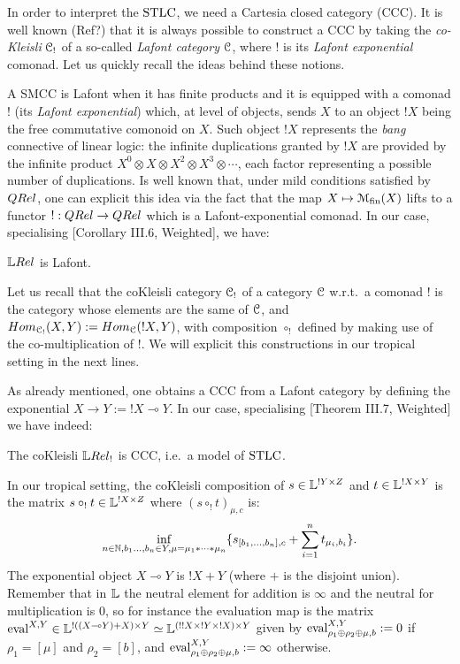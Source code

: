 
In order to interpret the $\mathrm{STLC}$, we need a Cartesia closed category (CCC).
It is well known ({\color{red}Ref?}) that it is always possible to construct a CCC by taking the \emph{co-Kleisli} $\mathcal{C}_!$ of a so-called \emph{Lafont category} $\mathcal{C}$, where $!$ is its \emph{Lafont exponential} comonad.
Let us quickly recall the ideas behind these notions.

A SMCC is Lafont when it has finite products and it is equipped with a comonad $!$ (its \emph{Lafont exponential}) which, at level of objects, sends $X$ to an object $!X$ being the free commutative comonoid on $X$.
Such object $!X$ represents the \emph{bang} connective of linear logic:
the infinite duplications granted by $!X$ are provided by the infinite product $X^0\otimes X\otimes X^2\otimes X^3\otimes\cdots$, each factor representing a possible number of duplications.
Is well known that, under mild conditions satisfied by $\QREL$, one can explicit this idea via the fact that the map $X\mapsto \mathcal{M}_{\mathrm{fin}}(X)$ lifts to a functor $!:\QREL\to\QREL$ which is a Lafont-exponential comonad.
In our case, specialising [Corollary III.6, Weighted], we have:

\begin{fact}
 $\LREL$ is Lafont.
\end{fact}

Let us recall that the coKleisli category $\mathcal{C}_!$ of a category $\mathcal{C}$ w.r.t.\ a comonad $!$ is the category whose elements are the same of $\mathcal{C}$, and $\HOM{\C C_!}{X}{Y}:=\HOM{\C C}{!X}{Y}$, with composition $\circ_!$ defined by making use of the co-multiplication of $!$.
We will explicit this constructions in our tropical setting in the next lines.

As already mentioned, one obtains a CCC from a Lafont category by defining the exponential $X\to Y:=!X \multimap Y$.
In our case, specialising [Theorem III.7, Weighted] we have indeed:
\begin{fact}
 The coKleisli $\LREL_!$ is CCC, i.e.\ a model of $\mathrm{STLC}$.
\end{fact}

In our tropical setting, the coKleisli composition of $s\in\mathbb{L}^{!Y\times Z}$ and $t\in\mathbb{L}^{!X\times Y}$ is the matrix $s\circ_! t\in\mathbb{L}^{!X\times Z}$ where $(s\circ_! t)_{\mu,c}$ is:
\[
 \inf\limits_{n\in\mathbb{N}, b_1\dots,b_n\in Y, \mu = \mu_1*\cdots *\mu_n}
 \{s_{[b_1,\dots,b_n],c} + \sum\limits_{i=1}^n t_{\mu_i,b_i}\}.
\]
The exponential object $X\multimap Y$ is $!X+Y$ (where $+$ is the disjoint union).
Remember that in $\mathbb{L}$ the neutral element for addition is $\infty$ and the neutral for multiplication is $0$, so for instance the evaluation map is the matrix $\mathrm{eval}^{X,Y}\in\mathbb{L}^{!((X\multimap Y) + X)\times Y}\simeq\mathbb{L}^{(!!X\times !Y\times !X)\times Y}$ given by $\mathrm{eval}^{X,Y}_{\rho_1\oplus\rho_2\oplus\mu,b}:=0$ if $\rho_1=[\mu]$ and $\rho_2=[b]$, and $\mathrm{eval}^{X,Y}_{\rho_1\oplus\rho_2\oplus\mu,b}:=\infty$ otherwise.

